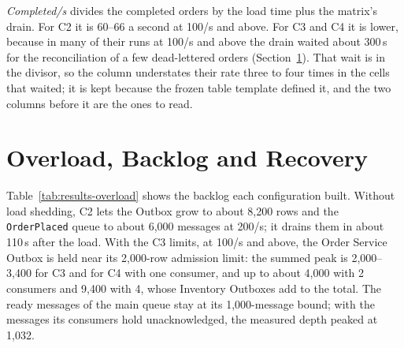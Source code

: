 \documentclass[a4paper]{report}
\begin{document}
\emph{Completed/s} divides the completed orders by the load time plus the
matrix's drain. For C2 it is 60--66 a second at 100/s and above. For C3 and C4
it is lower, because in many of their runs at 100/s and above the drain waited
about 300\,s for the reconciliation of a few dead-lettered orders
(Section~\ref{sec:results-overload}). That wait is in the divisor, so the
column understates their rate three to four times in the cells that waited;
it is kept because
the frozen table template defined it, and the two columns before it are the
ones to read.

\begin{table}[tbp]
\centering
\footnotesize
{}
\caption{Throughput and rates per cell. Achieved is the submission rate
JMeter reached (/s). Accepted counts the 2xx responses, equal to the orders in the database (C1: requests
decided). Done/s in load is the orders that reached \texttt{Completed} or
\texttt{Rejected} per second during the 60\,s load (C1: requests decided).
99\,\% done is the seconds after the last submission until unfinished orders
fall to 1\,\% of their count (Table~\ref{tab:results-recovery}; C1 builds no
backlog). $^{*}$Completed/s is completed orders divided by 60\,s plus the
drain; for C3 and C4 the drain usually includes the 300\,s reconciliation
wait, so it is not the pipeline's speed. Overload rejection counts 429 and
503 responses. Not shown because they are
the same in every run: 100\,\% of stock decisions reserved a unit, and no run
had any other non-2xx response. Cells: median of 3 runs (range).}
\label{tab:results-throughput}
\end{table}

\section{Overload, Backlog and Recovery}
\label{sec:results-overload}

Table~\ref{tab:results-overload} shows the backlog each configuration built.
Without load shedding, C2 lets the Outbox grow to about 8,200 rows and the
\texttt{OrderPlaced} queue to about 6,000 messages at 200/s; it drains them in
about 110\,s after the load. With the C3 limits, at 100/s and above, the Order Service Outbox is held near
its 2,000-row admission limit: the summed peak is 2,000--3,400 for C3 and for
C4 with one consumer, and up to about 4,000 with 2 consumers and 9,400 with 4,
whose Inventory Outboxes add to the total. The ready messages of the main
queue stay at its 1,000-message bound; with the messages its consumers hold
unacknowledged, the measured depth peaked at 1,032.
\end{document}
